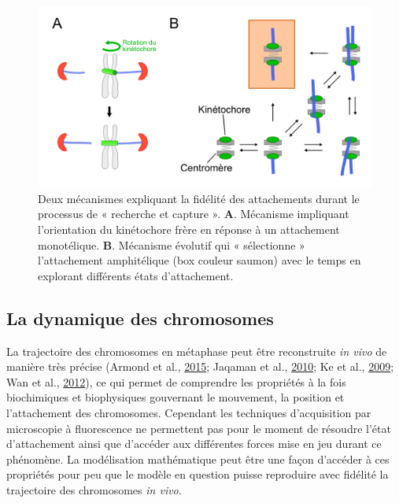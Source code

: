 \documentclass[12pt,a4paper,twoside,openright]{book}
\begin{document}
\begin{figure}[htbp]
\centering
\includegraphics{figures/intro/spindle_assembly.png}
\caption[Deux mécanismes de l'assemblage du fuseau mitotique]{\label{fig:spindle_assembly}Deux
mécanismes expliquant la fidélité des attachements durant le processus
de « recherche et capture ». \textbf{A}. Mécanisme impliquant
l'orientation du kinétochore frère en réponse à un attachement
monotélique. \textbf{B}. Mécanisme évolutif qui « sélectionne »
l'attachement amphitélique (box couleur saumon) avec le temps en
explorant différents états d'attachement.}
\end{figure}

\subsection{La dynamique des
chromosomes}\label{la-dynamique-des-chromosomes}

\label{sec:force-gen}

La trajectoire des chromosomes en métaphase peut être reconstruite
\emph{in vivo} de manière très précise (Armond et al.,
\hyperref[ref-Armond2015]{2015}; Jaqaman et al.,
\hyperref[ref-Jaqaman2010]{2010}; Ke et al.,
\hyperref[ref-Ke2009]{2009}; Wan et al., \hyperref[ref-Wan2012]{2012}),
ce qui permet de comprendre les propriétés à la fois biochimiques et
biophysiques gouvernant le mouvement, la position et l'attachement des
chromosomes. Cependant les techniques d'acquisition par microscopie à
fluorescence ne permettent pas pour le moment de résoudre l'état
d'attachement ainsi que d'accéder aux différentes forces mise en jeu
durant ce phénomène. La modélisation mathématique peut être une façon
d'accéder à ces propriétés pour peu que le modèle en question puisse
reproduire avec fidélité la trajectoire des chromosomes \emph{in vivo}.
\end{document}
